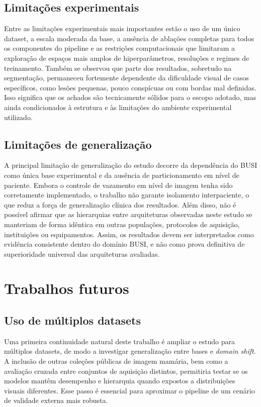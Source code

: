 \documentclass[tcc,capa]{texufpel}
\begin{document}
\subsection{Limitações experimentais}

Entre as limitações experimentais mais importantes estão o uso de um único dataset, a escala moderada da base, a ausência de ablações completas para todos os componentes do pipeline e as restrições computacionais que limitaram a exploração de espaços mais amplos de hiperparâmetros, resoluções e regimes de treinamento. Também se observou que parte dos resultados, sobretudo na segmentação, permaneceu fortemente dependente da dificuldade visual de casos específicos, como lesões pequenas, pouco conspícuas ou com bordas mal definidas. Isso significa que os achados são tecnicamente sólidos para o escopo adotado, mas ainda condicionados à estrutura e às limitações do ambiente experimental utilizado. 

\subsection{Limitações de generalização}

A principal limitação de generalização do estudo decorre da dependência do BUSI como única base experimental e da ausência de particionamento em nível de paciente. Embora o controle de vazamento em nível de imagem tenha sido corretamente implementado, o trabalho não garante isolamento interpaciente, o que reduz a força de generalização clínica dos resultados. Além disso, não é possível afirmar que as hierarquias entre arquiteturas observadas neste estudo se manteriam de forma idêntica em outras populações, protocolos de aquisição, instituições ou equipamentos. Assim, os resultados devem ser interpretados como evidência consistente dentro do domínio BUSI, e não como prova definitiva de superioridade universal das arquiteturas avaliadas. 

\section{Trabalhos futuros}

\subsection{Uso de múltiplos datasets}

Uma primeira continuidade natural deste trabalho é ampliar o estudo para múltiplos datasets, de modo a investigar generalização entre bases e \textit{domain shift}. A inclusão de outras coleções públicas de imagem mamária, bem como a avaliação cruzada entre conjuntos de aquisição distintos, permitiria testar se os modelos mantêm desempenho e hierarquia quando expostos a distribuições visuais diferentes. Esse passo é essencial para aproximar o pipeline de um cenário de validade externa mais robusta.
\end{document}
